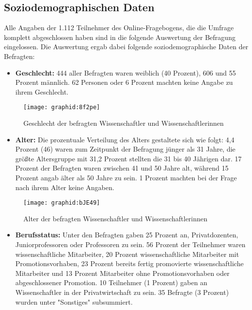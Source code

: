 \subsection{Soziodemographischen Daten}

Alle Angaben der 1.112 Teilnehmer des Online-Fragebogens, die die Umfrage komplett abgeschlossen haben sind in die folgende Auswertung der Befragung eingelossen. Die Auswertung ergab dabei folgende soziodemographische Daten der Befragten:

\begin{itemize}
\item \textbf{Geschlecht:} 444 aller Befragten waren weiblich (40 Prozent), 606 und 55 Prozent männlich. 62 Personen oder 6 Prozent machten keine Angabe zu ihrem Geschlecht.
\end{itemize}

\begin{figure}[h!]
\texttt{[image: graphid:8f2pe]}
\caption{Geschlecht der befragten Wissenschaftler und Wissenschaftlerinnen}
\end{figure}

\begin{itemize}
\item \textbf{Alter:} Die prozentuale Verteilung des Alters gestaltete sich wie folgt: 4,4 Prozent (46) waren zum Zeitpunkt der Befragung jünger als 31 Jahre, die größte Altersgruppe mit 31,2 Prozent stellten die 31 bis 40 Jährigen dar. 17 Prozent der Befragten waren zwischen 41 und 50 Jahre alt, während 15 Prozent angab älter als 50 Jahre zu sein. 1 Prozent machten bei der Frage nach ihrem Alter keine Angaben.
\end{itemize}

\begin{figure}[h!]
\texttt{[image: graphid:bJE49]}
\caption{Alter der befragten Wissenschaftler und Wissenschaftlerinnen}
\end{figure}

\begin{itemize}
\item \textbf{Berufsstatus:} Unter den Befragten gaben 25 Prozent an, Privatdozenten, Juniorprofessoren oder Professoren zu sein. 56 Prozent der Teilnehmer waren wissenschaftliche Mitarbeiter, 20 Prozent wissenschaftliche Mitarbeiter mit Promotionsvorhaben, 23 Prozent bereits fertig promovierte wissenschaftliche Mitarbeiter und 13 Prozent Mitarbeiter ohne Promotionsvorhaben oder abgeschlossener Promotion. 10 Teilnehmer (1 Prozent) gaben an Wissenschaftler in der Privatwirtschaft zu sein. 35 Befragte (3 Prozent) wurden unter "Sonstiges" subsummiert.
\end{itemize}

